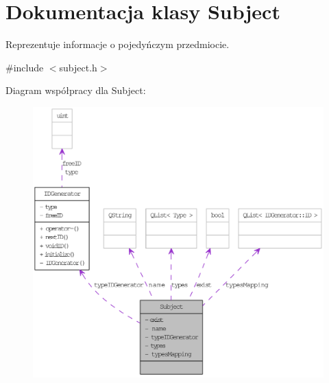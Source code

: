 \hypertarget{classSubject}{
\section{Dokumentacja klasy Subject}
\label{classSubject}
}


Reprezentuje informacje o pojedyńczym przedmiocie.  




{\ttfamily \#include $<$subject.h$>$}



Diagram współpracy dla Subject:\nopagebreak
\begin{figure}[H]
\begin{center}
\leavevmode
\includegraphics[width=400pt]{classSubject__coll__graph}
\end{center}
\end{figure}
